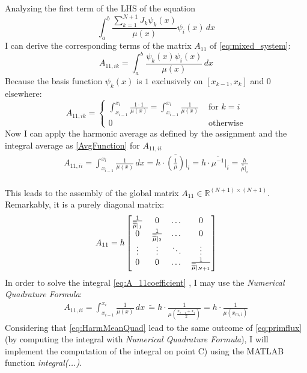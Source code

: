 \documentclass{article}
\begin{document}
Analyzing the first term of the LHS of the equation
\begin{equation*}
    \int_a^b \frac{\sum_{k=1}^{N+1} J_k \psi_k(x)}{\mu(x)} \psi_i(x) \, dx
\end{equation*}
I can derive the corresponding terms of the matrix $A_{11}$ of \eqref{eq:mixed_system}:
\begin{equation}
    A_{11,ik} = \int_a^b \frac{\psi_k(x) \psi_i(x)}{\mu(x)} \, dx
\end{equation}
Because the basis function $\psi_k(x)$ is $1$ exclusively on $[x_{k-1}, x_k]$ and $0$ elsewhere:
\begin{equation}
    A_{11,ik} = 
    \begin{cases}
        \int_{x_{i-1}}^{x_i} \frac{1 \cdot 1 }{\mu(x)} = \int_{x_{i-1}}^{x_i} \frac{1}{\mu(x)} &\text{  for } k=i \\
        0 &\text{  otherwise} 
    \end{cases}
\end{equation}
Now I can apply the harmonic average as defined by the assignment and the integral average as \eqref{AvgFunction} for $A_{11,ii}$
\begin{align}
   A_{11,ii} = \int_{x_{i-1}}^{x_i} \frac{1}{\mu(x)} \, dx = h \cdot \overline{\left(\frac{1}{\mu}\right)}\big|_i = h \cdot \overline{\mu^{-1}}\big|_i = \frac{h}{\bar{\bar{\mu}}\big|_i}\\
   \label{eq:A_11coefficient}
\end{align}

This leads to the assembly of the global matrix $A_{11} \in \mathbb{R}^{(N+1) \times (N+1)}$. Remarkably, it is a purely diagonal matrix:
\begin{equation} \label{eq:matrix_A11}
    A_{11} = h
    \begin{bmatrix}
        \frac{1}{\overline{\vphantom{\rule{0pt}{1.2ex}}\smash{\overline{\mu}}}|_1} & 0 & \dots & 0 \\
        0 & \frac{1}{\overline{\vphantom{\rule{0pt}{1.2ex}}\smash{\overline{\mu}}}|_2} & \dots & 0 \\
        \vdots & \vdots & \ddots & \vdots \\
        0 & 0 & \dots & \frac{1}{\overline{\vphantom{\rule{0pt}{1.2ex}}\smash{\overline{\mu}}}|_{N+1}}
    \end{bmatrix}
\end{equation}
In order to solve the integral \eqref{eq:A_11coefficient} , I may use the \textit{Numerical Quadrature Formula}:
\begin{align}
    A_{11,ii} = \int_{x_{i-1}}^{x_i} \frac{1}{\mu(x)} \, dx \, \widetilde{=} h \cdot \frac{1}{\mu(\frac{x_{i-1} + x_{i}}{2} )} = h \cdot \frac{1}{\mu(x_{m,i})}  
    \label{eq:HarmMeanQuad}
\end{align}
Considering that \eqref{eq:HarmMeanQuad} lead to the same outcome of \eqref{eq:primflux} (by computing the integral with \textit{Numerical Quadrature Formula}), I will implement the computation of the integral on point C) using the MATLAB function \textit{integral(...)}.
\end{document}
